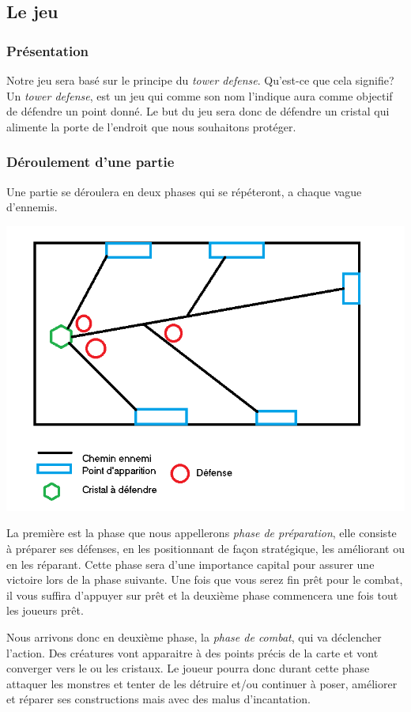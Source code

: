\documentclass[a4paper, 12pt]{article}
\begin{document}
	\subsection{Le jeu}
		\subsubsection{Présentation}
		\par Notre jeu sera basé sur le principe du \textit{tower defense}. Qu'est-ce que 			cela signifie? Un \textit{tower defense}, est un jeu qui comme son nom l'indique 			aura comme objectif de défendre un point donné. Le but du jeu sera donc de défendre 		un cristal qui alimente la porte de l'endroit que nous souhaitons protéger.  
		\subsubsection{Déroulement d'une partie}
		Une partie se déroulera en deux phases qui se répéteront, a chaque vague d'ennemis.\\
		\centerline{\includegraphics[scale=0.55]{Plan.png}}
		\par La première est la phase que nous appellerons \textit{phase de préparation}, elle consiste à préparer ses défenses, en les positionnant de façon stratégique, les améliorant ou en les réparant. Cette phase sera d'une importance capital pour assurer une victoire lors de la phase suivante. Une fois que vous serez fin prêt pour le combat, il vous suffira d'appuyer sur prêt et la deuxième phase commencera une fois tout les joueurs prêt.
		\par Nous arrivons donc en deuxième phase, la \textit{phase de combat}, qui va déclencher l'action. Des créatures vont apparaitre à des points précis de la carte et vont converger vers le ou les cristaux. Le joueur pourra donc durant cette phase attaquer les monstres et tenter de les détruire et/ou continuer à poser, améliorer et réparer ses constructions mais avec des malus d'incantation.
\end{document}
